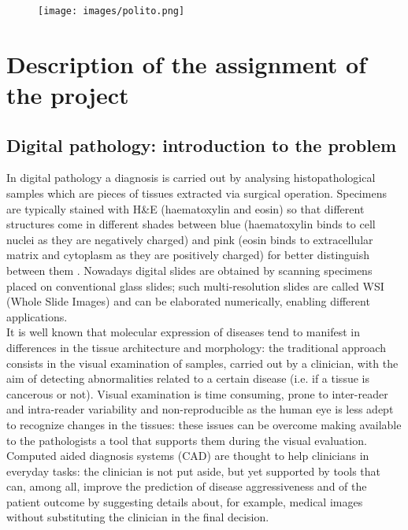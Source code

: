 \documentclass[12pt]{article}
\begin{document}
	
\begin{figure}
  \centering
  \texttt{[image: images/polito.png]}
\end{figure}

\maketitle
\newpage
\tableofcontents
\listoffigures
\newpage

\section{Description of the assignment of the project}
\subsection{Digital pathology: introduction to the problem}
In digital pathology a diagnosis is carried out by analysing histopathological samples which are pieces of tissues extracted via surgical operation. Specimens are typically stained with H\&E (haematoxylin and eosin) so that different structures come in different shades between blue (haematoxylin binds to cell nuclei as they are negatively charged) and pink (eosin binds to extracellular matrix and cytoplasm as they are positively charged) for better distinguish between them \cite{stain}. Nowadays digital slides are obtained by scanning specimens placed on conventional glass slides; such multi-resolution slides are called WSI (Whole Slide Images) and can be elaborated numerically, enabling different applications. \\ It is well known that molecular expression of diseases tend to manifest in differences in the tissue architecture and morphology: the traditional approach consists in the visual examination of samples, carried out by a clinician, with the aim of detecting abnormalities related to a certain disease (i.e. if a tissue is cancerous or not). Visual examination is time consuming, prone to inter-reader and intra-reader variability and non-reproducible as the human eye is less adept to recognize changes in the tissues: these issues can be overcome making available to the pathologists a tool that supports them during the visual evaluation.\cite{digpat1} \\ Computed aided diagnosis systems (CAD) are thought to help clinicians in everyday tasks: the clinician is not put aside, but yet supported by tools that can, among all, improve the prediction of disease aggressiveness and of the patient outcome by suggesting details about, for example, medical images without substituting the clinician in the final decision. \cite{digpat2}
\end{document}
